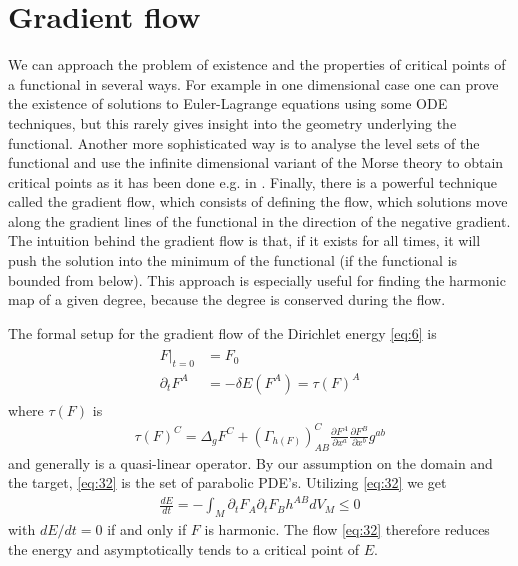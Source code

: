 \section{Gradient flow}
\label{sec:gradient-flow}

We can approach the problem of existence and the properties of
critical points of a functional in several ways. For example in one
dimensional case one can prove the existence of solutions to
Euler-Lagrange equations using some ODE techniques, but this rarely
gives insight into the geometry underlying the functional. Another
more sophisticated way is to analyse the level sets of the functional
and use the infinite dimensional variant of the Morse theory to obtain
critical points as it has been done e.g. in
\cite{Corlette2001}. Finally, there is a powerful technique called the
gradient flow, which consists of defining the flow, which solutions
move along the gradient lines of the functional in the direction of
the negative gradient. \\

The intuition behind the gradient flow is that, if it exists for all
times, it will push the solution into the minimum of the functional
(if the functional is bounded from below). This approach is especially
useful for finding the harmonic map of a given degree, because the
degree is conserved during the flow.

The formal setup for the gradient flow of the Dirichlet energy
\eqref{eq:6} is
\begin{align}
  \label{eq:32}
    \begin{split}
    F\big|_{t=0}&=F_0\\
    \partial_t F^A&=-\delta E(F^A)=\tau(F)^A
  \end{split}
\end{align}
where $\tau(F)$ is
\begin{align}
  \label{eq:33}
  \tau(F)^C=\Delta_g F^C+(\Gamma_{h(F)})_{AB}^{C}\frac{\partial
    F^A}{\partial x^a}\frac{\partial F^B}{\partial x^b}g^{ab}
\end{align}
and generally is a quasi-linear operator. By our assumption on the
domain and the target, \eqref{eq:32} is the set of parabolic
PDE's. Utilizing \eqref{eq:32} we get
\begin{align}
  \label{eq:34}
  \frac{dE}{dt}=-\int_M \partial_t F_A\partial_t F_B h^{AB}
  dV_M\le0
\end{align}
with $dE/dt=0$ if and only if $F$ is harmonic. The flow \eqref{eq:32}
therefore reduces the energy and asymptotically tends to a
critical point of $E$.\\

